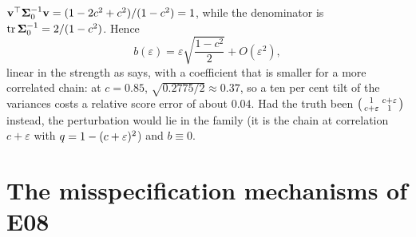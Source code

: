 \begin{example}
$\mathbf{v}^\top\mathbf{\Sigma}_0^{-1}\mathbf{v}=(1-2c^2+c^2)/(1-c^2)=1$, while the denominator is
$\operatorname{tr}\mathbf{\Sigma}_0^{-1}=2/(1-c^2)$. Hence
\begin{equation}
  b(\varepsilon)=\varepsilon\sqrt{\frac{1-c^2}{2}}+O(\varepsilon^2),
\end{equation}
linear in the strength as  says, with a coefficient that is
smaller for a more correlated chain: at $c=0.85$, $\sqrt{0.2775/2}\approx0.37$, so a
ten per cent tilt of the variances costs a relative score error of about $0.04$.
Had the truth been $\begin{psmallmatrix}1&c+\varepsilon\\ c+\varepsilon&1\end{psmallmatrix}$
instead, the perturbation would lie in the family (it is the chain at correlation
$c+\varepsilon$ with $q=1-(c+\varepsilon)^2$) and $b\equiv0$.
\end{example}

\section{The misspecification mechanisms of E08}
\label{sec:e08}

